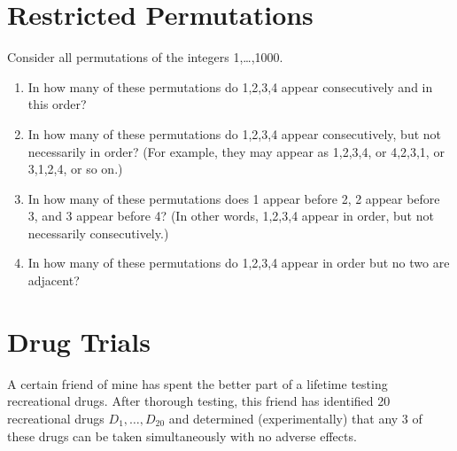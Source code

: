 \documentclass{article}
\begin{document}
\section{Restricted Permutations}

Consider all permutations of the integers 1,…,1000.

\begin{enumerate}

   \item In how many of these permutations do 1,2,3,4 appear consecutively and in this order?
   
   \item In how many of these permutations do 1,2,3,4 appear consecutively, but not necessarily in order? (For example, they may appear as 1,2,3,4, or 4,2,3,1, or 3,1,2,4, or so on.)

   \item In how many of these permutations does 1 appear before 2, 2 appear before 3, and 3 appear before 4? (In other words, 1,2,3,4 appear in order, but not necessarily consecutively.)
   
   \item In how many of these permutations do 1,2,3,4 appear in order but no two are adjacent?
   
\end{enumerate}

\section{Drug Trials}

A certain friend of mine has spent the better part of a lifetime testing recreational drugs. After thorough testing, this friend has identified 20 recreational drugs $D_1,\ldots,D_{20}$ and determined (experimentally) that any 3 of these drugs can be taken simultaneously with no adverse effects.
\end{document}
